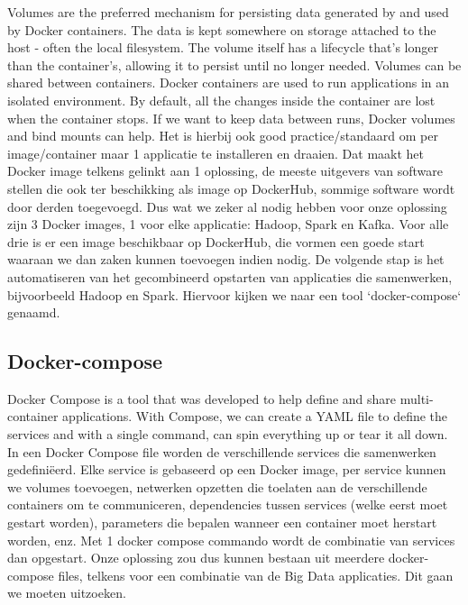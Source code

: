 Volumes are the preferred mechanism for persisting data generated by and used by Docker containers.
The data is kept somewhere on storage attached to the host - often the local filesystem. The volume itself has a lifecycle that's longer than the container's, allowing it to persist until no longer needed. Volumes can be shared between containers. \autocite{Javatpoint2023}
\newline
\newline
Docker containers are used to run applications in an isolated environment. By default, all the changes inside the container are lost when the container stops. If we want to keep data between runs, Docker volumes and bind mounts can help. \autocite{Frieze2022}
\newline
\newline
Het is hierbij ook good practice/standaard om per image/container maar 1 applicatie te installeren en draaien. Dat maakt het Docker image telkens gelinkt aan 1 oplossing, de meeste uitgevers van software stellen die ook ter beschikking als image op DockerHub, sommige software wordt door derden toegevoegd.
\newline
\newline
Dus wat we zeker al nodig hebben voor onze oplossing zijn 3 Docker images, 1 voor elke applicatie: Hadoop, Spark en Kafka. Voor alle drie is er een image beschikbaar op DockerHub, die vormen een goede start waaraan we dan zaken kunnen toevoegen indien nodig.
\newline
\newline
De volgende stap is het automatiseren van het gecombineerd opstarten van applicaties die samenwerken, bijvoorbeeld Hadoop en Spark. Hiervoor kijken we naar een tool `docker-compose` genaamd.

\subsection{Docker-compose}
Docker Compose is a tool that was developed to help define and share multi-container applications. With Compose, we can create a YAML file to define the services and with a single command, can spin everything up or tear it all down. \autocite{Docker2023}
\newline
\newline
In een Docker Compose file worden de verschillende services die samenwerken gedefiniëerd. Elke service is gebaseerd op een Docker image, per service kunnen we volumes toevoegen, netwerken opzetten die toelaten aan de verschillende containers om te communiceren, dependencies tussen services (welke eerst moet gestart worden), parameters die bepalen wanneer een container moet herstart worden, enz.
\newline
\newline
Met 1 docker compose commando wordt de combinatie van services dan opgestart.
\newline
\newline
Onze oplossing zou dus kunnen bestaan uit meerdere docker-compose files, telkens voor een combinatie van de Big Data applicaties. Dit gaan we moeten uitzoeken.
\newline
\newline

